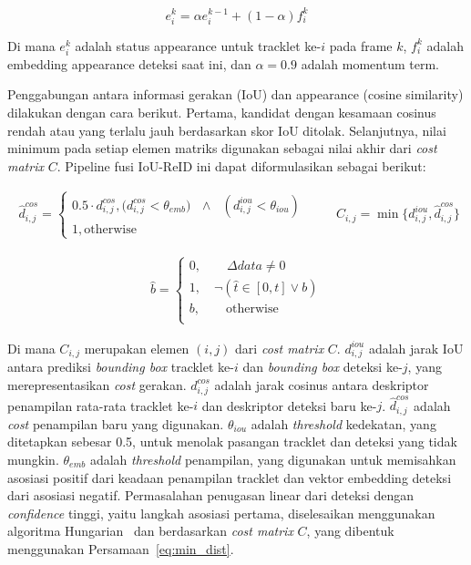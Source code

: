\begin{equation}
e_i^k = \alpha e_i^{k-1} + (1 - \alpha) f_i^k
\end{equation}

Di mana $e_i^k$ adalah status appearance untuk tracklet ke-$i$ pada frame $k$, $f_i^k$ adalah embedding appearance deteksi saat ini, dan $\alpha=0.9$ adalah momentum term.

Penggabungan antara informasi gerakan (IoU) dan appearance (cosine similarity) dilakukan dengan cara berikut. Pertama, kandidat dengan kesamaan cosinus rendah atau yang terlalu jauh berdasarkan skor IoU ditolak. Selanjutnya, nilai minimum pada setiap elemen matriks digunakan sebagai nilai akhir dari \emph{cost matrix} $C$. Pipeline fusi IoU-ReID ini dapat diformulasikan sebagai berikut:

\begin{equation}
    \begin{aligned}
    \hat{d}_{i, j}^{cos} = 
        \begin{cases}
                0.5 \cdot d_{i, j}^{cos}, \text{($d_{i, j}^{cos} < \theta_{emb})$ $\land$ $(d_{i, j}^{iou} < \theta_{iou})$}\\
            1, \text{otherwise}
        \end{cases}
    \end{aligned}
    \quad\quad C_{i, j} = \min\{d_{i, j}^{iou}, \hat{d}_{i, j}^{cos}\}    
    \label{eq:min_dist}        
\end{equation}

\begin{equation}
  \begin{aligned}
  \hat{b} = 
      \begin{cases}
          0, \quad\quad \Delta data \neq 0 \\
          1, \quad \neg ( \hat{t} \in [0, t] \lor b ) \\
          b, \quad\quad \text{otherwise}\\
      \end{cases}
  \end{aligned}       
\end{equation}

Di mana $C_{i, j}$ merupakan elemen $(i, j)$ dari \emph{cost matrix} $C$. $d_{i, j}^{iou}$ adalah jarak IoU antara prediksi \emph{bounding box} tracklet ke-$i$ dan \emph{bounding box} deteksi ke-$j$, yang merepresentasikan \emph{cost} gerakan. $d_{i, j}^{cos}$ adalah jarak cosinus antara deskriptor penampilan rata-rata tracklet ke-$i$ dan deskriptor deteksi baru ke-$j$. $\hat{d}_{i, j}^{cos}$ adalah \emph{cost} penampilan baru yang digunakan. $\theta_{iou}$ adalah \emph{threshold} kedekatan, yang ditetapkan sebesar 0.5, untuk menolak pasangan tracklet dan deteksi yang tidak mungkin. $\theta_{emb}$ adalah \emph{threshold} penampilan, yang digunakan untuk memisahkan asosiasi positif dari keadaan penampilan tracklet dan vektor embedding deteksi dari asosiasi negatif.
Permasalahan penugasan linear dari deteksi dengan \emph{confidence} tinggi, yaitu langkah asosiasi pertama, diselesaikan menggunakan algoritma Hungarian~\cite{kuhn1955hungarian} dan berdasarkan \emph{cost matrix} $C$, yang dibentuk menggunakan Persamaan~\ref{eq:min_dist}.

